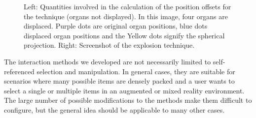 \begin{figure}
	\caption[Organ Explosion]{Left: Quantities involved in the calculation of the position offsets for the technique (organs not displayed). In this image, four organs are displaced. Purple dots are original organ positions, blue dots displaced organ positions and the Yellow dots signify the spherical projection. Right: Screenshot of the explosion technique.}
	\label{fig:3-IMR:organExplosion}
\end{figure}
The interaction methods we developed are not necessarily limited to self-referenced selection and manipulation. In general cases, they are suitable for scenarios where many possible items are densely packed and a user wants to select a single or multiple items in an augmented or mixed reality environment. The large number of possible modifications to the methods make them difficult to configure, but the general idea should be applicable to many other cases.

